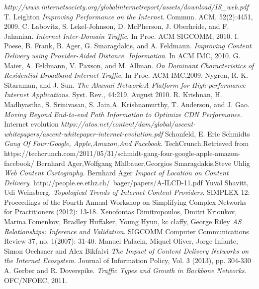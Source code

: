 \begin{thebibliography}{}
\textit{http://www.internetsociety.org/globalinternetreport/assets/download/IS_web.pdf}
T. Leighton
\textit{Improving Performance on the Internet}.
Commun. ACM, 52(2):4451, 2009.
C. Labovitz, S. Lekel-Johnson, D. McPherson, J. Oberheide, and F. Jahanian. 
\textit{Internet Inter-Domain Traffic}.
In Proc. ACM SIGCOMM, 2010.
I. Poese, B. Frank, B. Ager, G. Smaragdakis, and A. Feldmann.
\textit{Improving Content Delivery using Provider-Aided Distance. Information}. 
In ACM IMC, 2010.
G. Maier, A. Feldmann, V. Paxson, and M. Allman.
\textit{On Dominant Characteristics of Residential Broadband Internet Traffic}.
In Proc. ACM IMC,2009.
Nygren, R. K. Sitaraman, and J. Sun. 
\textit{The Akamai Network:A Platform for High-performance Internet Applications}.
Syst. Rev., 44:219, August 2010.
R. Krishnan, H. Madhyastha, S. Srinivasan, S. Jain,A. Krishnamurthy, T.
Anderson, and J. Gao. 
\textit{Moving Beyond End-to-end Path Information to Optimize CDN Performance}.
Internet evolution
\textit{https://atos.net/content/dam/global/ascent-whitepapers/ascent-whitepaper-internet-evolution.pdf}
Schonfeld, E. Eric Schmidts 
\textit{Gang Of Four:Google, Apple,Amazon,And Facebook}.
TechCrunch.Retrieved from https://techcrunch.com/2011/05/31/schmidt-gang-four-google-apple-amazon-facebook/
Bernhard Ager,Wolfgang Mhlbauer,Georgios Smaragdakis,Steve Uhlig
\textit{Web Content Cartography.}
Bernhard Ager 
\textit{Impact of Location on Content Delivery}.
http://people.ee.ethz.ch/~bager/papers/A-ILCD-11.pdf
Yuval Shavitt, Udi Weinsberg.
\textit{Topological Trends of Internet Content Providers}.
SIMPLEX 12: Proceedings of the Fourth Annual Workshop on
Simplifying Complex Networks for Practitioners (2012): 13-18.
Xenofontas Dimitropoulos, Dmitri Krioukov, Marina Fomenkov, Bradley
Huffaker, Young Hyun, kc claffy, George Riley 
\textit{AS Relationships: Inference and Validation}.
SIGCOMM Computer Communications Review 37, no. 1(2007): 31-40.
Manuel Palacin, Miquel Oliver, Jorge Infante, Simon Oechsner and Alex
Bikfalvi 
\textit{The Impact of Content Delivery Networks on the Internet Ecosystem}.
Journal of Information Policy, Vol. 3 (2013), pp. 304-330
A. Gerber and R. Doverspike.
\textit{Traffic Types and Growth in Backbone Networks}.
OFC/NFOEC, 2011.

\end{thebibliography}
